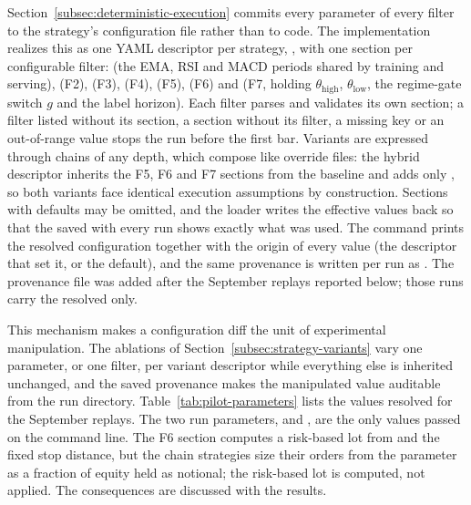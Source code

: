 Section~\ref{subsec:deterministic-execution} commits every parameter of every filter to the strategy's configuration file rather than to code. The implementation realizes this as one YAML descriptor per strategy, , with one section per configurable filter:  (the EMA, RSI and MACD periods shared by training and serving),  (F2),  (F3),  (F4),  (F5),  (F6) and  (F7, holding $\theta_{\text{high}}$, $\theta_{\text{low}}$, the regime-gate switch $g$ and the label horizon). Each filter parses and validates its own section; a filter listed without its section, a section without its filter, a missing key or an out-of-range value stops the run before the first bar. Variants are expressed through  chains of any depth, which compose like override files: the hybrid descriptor inherits the F5, F6 and F7 sections from the baseline and adds only , so both variants face identical execution assumptions by construction. Sections with defaults may be omitted, and the loader writes the effective values back so that the  saved with every run shows exactly what was used. The command  prints the resolved configuration together with the origin of every value (the descriptor that set it, or the default), and the same provenance is written per run as . The provenance file was added after the September replays reported below; those runs carry the resolved  only.

This mechanism makes a configuration diff the unit of experimental manipulation. The ablations of Section~\ref{subsec:strategy-variants} vary one parameter, or one filter, per variant descriptor while everything else is inherited unchanged, and the saved provenance makes the manipulated value auditable from the run directory. Table~\ref{tab:pilot-parameters} lists the values resolved for the September replays. The two run parameters,  and , are the only values passed on the command line. The F6 section computes a risk-based lot from  and the fixed stop distance, but the chain strategies size their orders from the  parameter as a fraction of equity held as notional; the risk-based lot is computed, not applied. The consequences are discussed with the results.

